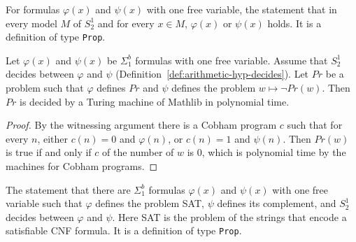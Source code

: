 \begin{definition}
  \label{def:arithmetic-hyp-decides}
  \leanok
  For formulas $\varphi(x)$ and $\psi(x)$ with one free variable, the statement that in every model
  $M$ of $S^1_2$ and for every $x \in M$, $\varphi(x)$ or $\psi(x)$ holds. It is a definition of
  type \texttt{Prop}.
\end{definition}

\begin{theorem}
  \label{thm:arithmetic-delta-p}
  \leanok
  Let $\varphi(x)$ and $\psi(x)$ be $\Sigma^b_1$ formulas with one free variable. Assume that
  $S^1_2$ decides between $\varphi$ and $\psi$ (Definition~\ref{def:arithmetic-hyp-decides}). Let
  $\mathit{Pr}$ be a problem such that $\varphi$ defines $\mathit{Pr}$ and $\psi$ defines the
  problem $w \mapsto \neg \mathit{Pr}(w)$. Then $\mathit{Pr}$ is decided by a Turing machine of
  Mathlib in polynomial time.
\end{theorem}

\begin{proof}
  \leanok
  By the witnessing argument there is a Cobham program $c$ such that for every $n$, either
  $c(n) = 0$ and $\varphi(n)$, or $c(n) = 1$ and $\psi(n)$. Then $\mathit{Pr}(w)$ is true if and only
  if $c$ of the number of $w$ is $0$, which is polynomial time by the machines for Cobham programs.
\end{proof}

\begin{definition}
  \label{def:arithmetic-hyp-decides-sat}
  \leanok
  The statement that there are $\Sigma^b_1$ formulas $\varphi(x)$ and $\psi(x)$ with one free
  variable such that $\varphi$ defines the problem SAT, $\psi$ defines its complement, and $S^1_2$
  decides between $\varphi$ and $\psi$. Here SAT is the problem of the strings that encode a
  satisfiable CNF formula. It is a definition of type \texttt{Prop}.
  \own{}
\end{definition}

